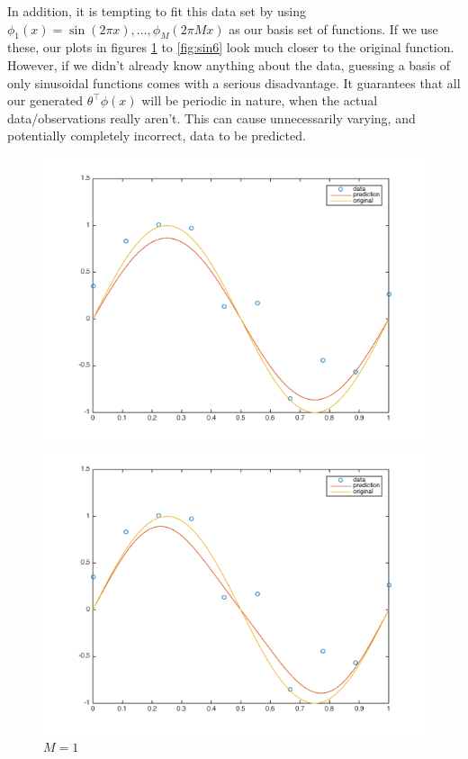 \documentclass[10pt,letterpaper]{article}
\begin{document}
In addition, it is tempting to fit this data set by using $\phi_1(x) = \sin(2\pi x), \ldots , \phi_M(2\pi Mx)$ as our basis set of functions. If we use these, our plots in figures \ref{fig:sin1} to \ref{fig:sin6} look much closer to the original function. However, if we didn't already know anything about the data, guessing a basis of only sinusoidal functions comes with a serious disadvantage. It guarantees that all our generated $\theta^\intercal\phi(x)$ will be periodic in nature, when the actual data/observations really aren't. This can cause unnecessarily varying, and potentially completely incorrect, data to be predicted.\\
\begin{figure}[h!]
  \includegraphics[width=\linewidth]{figures/sin1.png}
  \caption{$M = 1$}\label{fig:sin1}
\endminipage\hfill
{}
  \includegraphics[width=\linewidth]{figures/sin3.png}

\end{figure}
\end{document}
